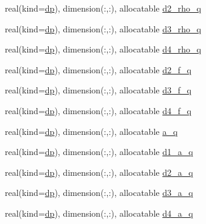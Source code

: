 \begin{DoxyCompactItemize}
real(kind=\mbox{\hyperlink{namespaceparameters_a52f8c6351fd79345d8811e065bcbbb37}{dp}}), dimension(\+:,\+:), allocatable \mbox{\hyperlink{namespaceparameters_a0234a871e1ff1d0be38099df82c5e698}{d2\+\_\+rho\+\_\+q}}
\item 
real(kind=\mbox{\hyperlink{namespaceparameters_a52f8c6351fd79345d8811e065bcbbb37}{dp}}), dimension(\+:,\+:), allocatable \mbox{\hyperlink{namespaceparameters_a1621c80d10f0cca4fec0e20ffbdda0f5}{d3\+\_\+rho\+\_\+q}}
\item 
real(kind=\mbox{\hyperlink{namespaceparameters_a52f8c6351fd79345d8811e065bcbbb37}{dp}}), dimension(\+:,\+:), allocatable \mbox{\hyperlink{namespaceparameters_a59deaa51eaa68f574d57f364fff6c77a}{d4\+\_\+rho\+\_\+q}}
\item 
real(kind=\mbox{\hyperlink{namespaceparameters_a52f8c6351fd79345d8811e065bcbbb37}{dp}}), dimension(\+:,\+:), allocatable \mbox{\hyperlink{namespaceparameters_a4e57ed84b90c4ca5998a9cdaa8ccb2da}{d2\+\_\+f\+\_\+q}}
\item 
real(kind=\mbox{\hyperlink{namespaceparameters_a52f8c6351fd79345d8811e065bcbbb37}{dp}}), dimension(\+:,\+:), allocatable \mbox{\hyperlink{namespaceparameters_ada2cda17d0e9bccb3581a5b22a05f876}{d3\+\_\+f\+\_\+q}}
\item 
real(kind=\mbox{\hyperlink{namespaceparameters_a52f8c6351fd79345d8811e065bcbbb37}{dp}}), dimension(\+:,\+:), allocatable \mbox{\hyperlink{namespaceparameters_af226839e94cc06ff5d33f92af38a014c}{d4\+\_\+f\+\_\+q}}
\item 
real(kind=\mbox{\hyperlink{namespaceparameters_a52f8c6351fd79345d8811e065bcbbb37}{dp}}), dimension(\+:,\+:), allocatable \mbox{\hyperlink{namespaceparameters_a537af93b5aaa713688d624f145ebde80}{a\+\_\+q}}
\item 
real(kind=\mbox{\hyperlink{namespaceparameters_a52f8c6351fd79345d8811e065bcbbb37}{dp}}), dimension(\+:,\+:), allocatable \mbox{\hyperlink{namespaceparameters_aaeb8117f8c15d7a7414e15929e12b0a8}{d1\+\_\+a\+\_\+q}}
\item 
real(kind=\mbox{\hyperlink{namespaceparameters_a52f8c6351fd79345d8811e065bcbbb37}{dp}}), dimension(\+:,\+:), allocatable \mbox{\hyperlink{namespaceparameters_ab2833e12dbfca51501df8955b00dd7d0}{d2\+\_\+a\+\_\+q}}
\item 
real(kind=\mbox{\hyperlink{namespaceparameters_a52f8c6351fd79345d8811e065bcbbb37}{dp}}), dimension(\+:,\+:), allocatable \mbox{\hyperlink{namespaceparameters_a1449283e577e2769bd8bb5d57dbf1876}{d3\+\_\+a\+\_\+q}}
\item 
real(kind=\mbox{\hyperlink{namespaceparameters_a52f8c6351fd79345d8811e065bcbbb37}{dp}}), dimension(\+:,\+:), allocatable \mbox{\hyperlink{namespaceparameters_a68e56fd9914d22072aed5a180c5a17b2}{d4\+\_\+a\+\_\+q}}

\end{DoxyCompactItemize}
